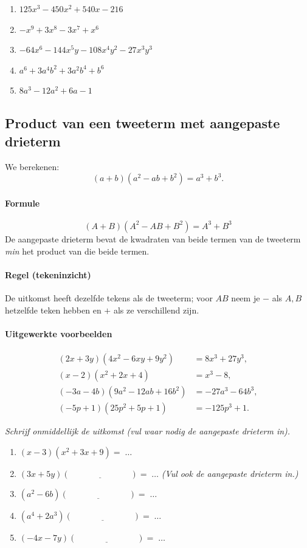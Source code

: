 \documentclass{bis}
\begin{document}
\begin{solution}
\begin{enumerate}
  \item \(125x^3-450x^2+540x-216\)
  \item \({-}x^9+3x^8-3x^7+x^6\)
  \item \({-}64x^6-144x^5y-108x^4y^2-27x^3y^3\)
  \item \(a^6+3a^4b^2+3a^2b^4+b^6\)
  \item \(8a^3-12a^2+6a-1\)
\end{enumerate}
\end{solution}

\subsection{Product van een tweeterm met aangepaste drieterm}
We berekenen:
\[
(a+b)(a^2-ab+b^2)=a^3+b^3.
\]

\paragraph*{Formule}
\[
\boxed{(A+B)(A^2-AB+B^2)=A^3+B^3}
\]
De aangepaste drieterm bevat de kwadraten van beide termen van de tweeterm \emph{min} het product van die beide termen.

\paragraph*{Regel (tekeninzicht)}
De uitkomst heeft dezelfde tekens als de tweeterm; voor \(AB\) neem je \(-\) als \(A,B\) hetzelfde teken hebben en \(+\) als ze verschillend zijn.

\paragraph*{Uitgewerkte voorbeelden}
\[
\begin{aligned}
(2x+3y)(4x^2-6xy+9y^2)&=8x^3+27y^3,\\
(x-2)(x^2+2x+4)&=x^3-8,\\
({-}3a-4b)(9a^2-12ab+16b^2)&={-}27a^3-64b^3,\\
({-}5p+1)(25p^2+5p+1)&={-}125p^3+1.
\end{aligned}
\]

\begin{exercise}
\emph{Schrijf onmiddellijk de uitkomst (vul waar nodig de aangepaste drieterm in).}
\begin{enumerate}
  \item \((x-3)(x^2+3x+9)=\;\ldots\)
  \item \((3x+5y)(\underline{\hspace{3cm}})=\;\ldots\) \quad \emph{(Vul ook de aangepaste drieterm in.)}
  \item \((a^2-6b)(\underline{\hspace{3cm}})=\;\ldots\)
  \item \((a^4+2a^3)(\underline{\hspace{3cm}})=\;\ldots\)
  \item \(({-}4x-7y)(\underline{\hspace{3cm}})=\;\ldots\)
\end{enumerate}
\end{exercise}
\end{document}
